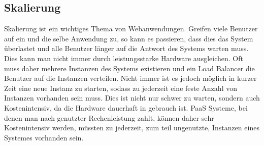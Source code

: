 \subsection{Skalierung}
\label{subsec:SkalierungMonolithisch}
Skalierung ist ein wichtiges Thema von Webanwendungen. Greifen viele Benutzer auf ein und die selbe Anwendung zu, so kann es passieren, dass dies das System überlastet und alle Benutzer länger auf die Antwort des Systems warten muss. Dies kann man nicht immer durch leistungsstarke Hardware ausgleichen. Oft muss daher mehrere Instanzen des Systems existieren und ein Load Balancer die Benutzer auf die Instanzen verteilen. Nicht immer ist es jedoch möglich in kurzer Zeit eine neue Instanz zu starten, sodass zu jederzeit eine feste Anzahl von Instanzen vorhanden sein muss. Dies ist nicht nur schwer zu warten, sondern auch Kostenintensiv, da die Hardware dauerhaft in gebrauch ist. PaaS Systeme, bei denen man nach genutzter Rechenleistung zahlt, können daher sehr Kostenintensiv werden, müssten zu jederzeit, zum teil ungenutzte, Instanzen eines Systemes vorhanden sein.